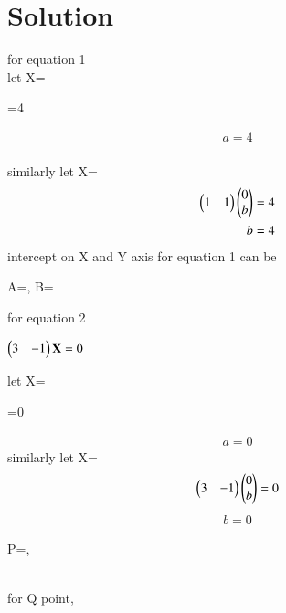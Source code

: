 \documentclass[journal,12pt,twocolumn]{IEEEtran}
\begin{document}
\section{Solution}
for equation 1\\
let X=
\begin{center}
    =4\\
\end{center}
\begin{align}
     a=4
\end{align}\\
similarly let X=
\begin{align}
\begin{pmatrix}1&1\end{pmatrix}\begin{pmatrix}0\\b\end{pmatrix}=4\\
b=4
\end{align}
intercept on X and Y axis for equation 1 can be
\begin{center}
A=, B=
\end{center}
for equation 2
\begin{center}
$\begin{pmatrix}3&-1\end{pmatrix}\mathbf{X}=0$
\end{center}
let X=
\begin{center}
=0
\end{center}
\begin{align}
    a=0
\end{align}
similarly let X=
\begin{align}
\begin{pmatrix}3&-1\end{pmatrix}\begin{pmatrix}0\\b\end{pmatrix}=0
\end{align}
\begin{align}b=0
\end{align}
\begin{center}
    P=,
\end{center}\\
for Q point,\\
\end{document}
